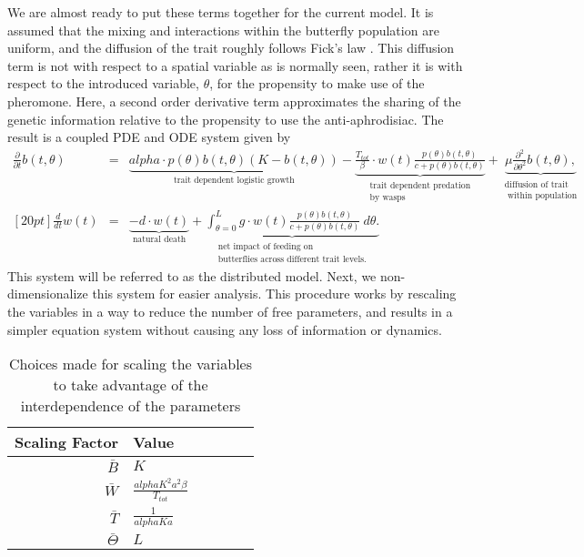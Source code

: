\documentclass[review,authoryear]{elsarticle}
\def\alpha{alpha}%
\newcommand{\origB}{{b}}
\newcommand{\origW}{{w}}
\newcommand{\origAlpha}{{\alpha}}
\newcommand{\origK}{{K}}
\newcommand{\origA}{{a}}
\newcommand{\origD}{{d}}
\newcommand{\origG}{{g}}
\newcommand{\origL}{{L}}
\newcommand{\origTheta}{{\theta}}
\newcommand{\origT}{{t}}
\newcommand{\origMu}{{\mu}}
\begin{document}
We are almost ready to put these terms together for the current
model. It is assumed that the mixing and interactions within the
butterfly population are uniform, and the diffusion of the trait
roughly follows Fick's law \citep{logan2006applied}. This diffusion term is not with respect to a spatial variable as is normally seen, rather it is with respect to the introduced variable, $\theta$, for the propensity to make use of the pheromone. Here, a second
order derivative term approximates the sharing of the genetic
information relative to the propensity to use the
anti-aphrodisiac. The result is a coupled PDE and ODE system given by
\begin{eqnarray}
  \label{eq:odePDE1}
  \frac{\partial}{\partial \origT} \origB(\origT,\origTheta) & = &
     \underbrace{  \origAlpha  \cdot p(\origTheta) \origB(\origT,\origTheta) (\origK - \origB(\origT,\origTheta)) }_\text{trait dependent logistic growth}
      -  \underbrace{\frac{T_{tot}}{\beta} \cdot \origW(\origT) \frac{p(\origTheta) \origB(\origT,\origTheta)}{c+p(\origTheta)\origB(\origT,\origTheta)} }_{\substack{\text{trait dependent predation} \\ \text{by wasps}}}
      +  \underbrace{\origMu \frac{\partial^2}{\partial \origTheta^2} \origB(\origT,\origTheta),}_{\substack{\text{diffusion of trait} \\ \text{ within population}}} \\ [20pt]
  \label{eq:odePDE2}
  \frac{d}{d\origT} \origW(\origT) & = &  \underbrace{-\origD \cdot \origW(\origT) }_\text{natural death}  +
        \underbrace{
          \int^{\origL}_{\origTheta=0} \origG \cdot \origW(\origT) \frac{p(\origTheta) \origB(\origT,\origTheta) }{c + p(\origTheta) \origB(\origT,\origTheta)} ~ d\origTheta.
       }_{\substack{\text{net impact of feeding on} \\ \text{butterflies across different trait levels.}}}
\end{eqnarray}
This system will be referred to as the distributed model. Next, we non-dimensionalize this system for easier analysis. This procedure works by rescaling the variables in a way to reduce the number of free parameters, and results in a simpler equation system without causing any loss of information or dynamics. 

\begin{table}[ht]
  \centering
  \begin{tabular}{r@{$\,=\,$}l}
    Scaling Factor & Value ~~~~~~~~ \\ \hline
    $\bar{B}$ & $\origK$ \\ [10pt]
    $\bar{W}$ & $\frac{\origAlpha \origK^2 \origA^2 \beta}{T_{tot}}$ \\  [10pt]
    $\bar{T}$ & $\frac{1}{\origAlpha \origK \origA}$ \\  [10pt]
    $\bar{\Theta}$ & $\origL$
  \end{tabular}
  \caption{Choices made for scaling the variables to take advantage of the interdependence of the parameters}
  \label{tab:scalingChoices}
\end{table}
\end{document}
